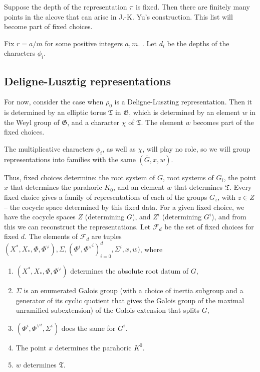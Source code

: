 \documentclass[12pt]{amsart}
\newcommand{\cF}{\mathcal{F}}
\def\cF{\mathcal{F}}
\newcommand{\fG}{\mathfrak G}
\newcommand{\fT}{\mathfrak T}
\theoremstyle{plain}
\theoremstyle{definition}
\begin{document}
Suppose the depth of the representation $\pi$ is fixed. Then there are finitely many points in the alcove that can arise in J.-K. Yu's construction. This list will become part of fixed choices. 

Fix $r=a/m$ for some positive integers $a, m$. .
Let $d_i$ be the depths of the characters $\phi_i$. 
  
\subsection{Deligne-Lusztig representations} 
For now, consider the case when $\rho_0$ is a Deligne-Luszting representation. 
Then it is determined by an elliptic torus $\fT$ in $\fG$, which is determined by an element $w$ in the Weyl group of $\fG$, and a character $\chi$ of $\fT$.  
The element $w$ becomes  part of the fixed choices.
  
The multiplicative characters $\phi_i$, as well as $\chi$, will play no role, so we will group 
representations into families with the same $(\bar G, x, w)$. 

Thus, fixed choices determine: the root system of $G$, root systems of $G_i$, 
the point $x$ that determines the parahoric $K_0$, and an element $w$ that determines 
$\fT$.  
Every fixed choice gives a family of representations of each of the groups $G_z$, with $z\in Z$ -- the cocycle space determined by this fixed data.
For a given fixed choice, we have the cocycle spaces $Z$ (determining $G$), and $Z^i$ (determining $G^i$), and from this we can reconstruct the representations. 
Let $\cF_d$ be the set of fixed choices for fixed $d$.
The elements of $\cF_d$ are tuples 
$(X^\ast, X_\ast, \Phi, \Phi^\vee), \Sigma, (\Phi^i, {\Phi^\vee}^i)_{i=0}^d, \Sigma^i, x, w)$, where 
\begin{enumerate}
\item  $(X^\ast, X_\ast, \Phi, \Phi^\vee)$  determines the absolute root datum of $G$, 
\item $\Sigma$ is an enumerated Galois group (with a choice of inertia subgroup and a 
generator of its cyclic quotient that gives the Galois group of the maximal unramified 
subextension) of the Galois extension that splits $G$,
\item  $(\Phi^i, {\Phi^\vee}^i, \Sigma^i)$ does the same for $G^i$. 
\item  The point $x$  determines the parahoric $K^0$.   
\item $w$ determines  $\fT$. 
\end{enumerate}
\end{document}
